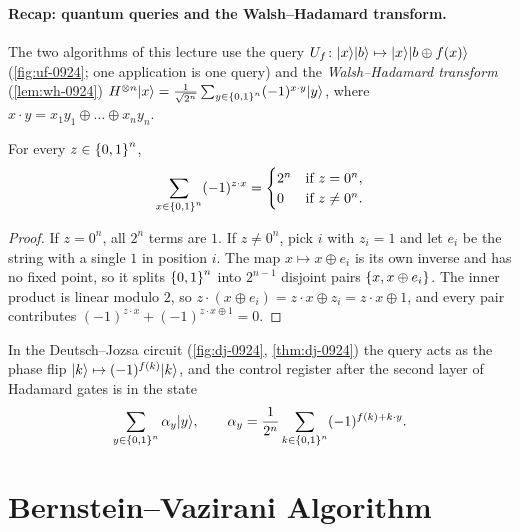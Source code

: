 
\paragraph{Recap: quantum queries and the Walsh--Hadamard transform.}

The two algorithms of this lecture use the query
$U_f \colon \lvert x \rangle\lvert b \rangle \mapsto \lvert x \rangle\lvert b \oplus f(x) \rangle$ (\cref{fig:uf-0924}; one application is
one query) and the \emph{Walsh--Hadamard transform} (\cref{lem:wh-0924})
$H^{\otimes n} \lvert x \rangle = \frac{1}{\sqrt{2^n}} \sum_{y \in \left\lbrace0,1\right\rbrace^n} (-1)^{x \cdot y} \lvert y \rangle$, where
$x \cdot y = x_1 y_1 \oplus \dots \oplus x_n y_n$.

\begin{claim}\label{lem:signsum-0929}
    For every $z \in \left\lbrace0,1\right\rbrace^n$,
    \[\sum_{x \in \left\lbrace0,1\right\rbrace^n} (-1)^{z \cdot x} =
        \begin{cases}
            2^n & \text{if } z = 0^n, \\
            0   & \text{if } z \neq 0^n.
        \end{cases}\]
\end{claim}

\begin{proof}
    If $z = 0^n$, all $2^n$ terms are $1$. If $z \neq 0^n$, pick $i$ with $z_i = 1$ and let $e_i$ be
    the string with a single $1$ in position $i$. The map $x \mapsto x \oplus e_i$ is its own inverse
    and has no fixed point, so it splits $\left\lbrace0,1\right\rbrace^n$ into $2^{n-1}$ disjoint pairs
    $\left\lbrace x, x \oplus e_i\right\rbrace$. The inner product is linear modulo $2$, so
    $z \cdot (x \oplus e_i) = z \cdot x \oplus z_i = z \cdot x \oplus 1$, and every pair contributes
    $(-1)^{z \cdot x} + (-1)^{z \cdot x \oplus 1} = 0$.
\end{proof}

In the Deutsch--Jozsa circuit (\cref{fig:dj-0924}, \cref{thm:dj-0924}) the query acts as the phase
flip $\lvert k \rangle \mapsto (-1)^{f(k)} \lvert k \rangle$, and the control register after the second layer of Hadamard
gates is in the state
\begin{equation}\label{eq:dj-state-0929}
    \sum_{y \in \left\lbrace0,1\right\rbrace^n} \alpha_y \lvert y \rangle,
    \qquad
    \alpha_y = \frac{1}{2^n} \sum_{k \in \left\lbrace0,1\right\rbrace^n} (-1)^{f(k) + k \cdot y}.
\end{equation}

\section{Bernstein--Vazirani Algorithm}

